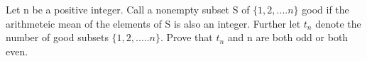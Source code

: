 \item Let n be a positive integer. Call a nonempty subset S of $\{1,2,....n\}$ good if the arithmeteic mean of the elements of S is also an integer. Further let $t_n$ denote the number of good subsets $\{1,2,.....n\}$. Prove that $t_n$ and n are both odd or both even.




